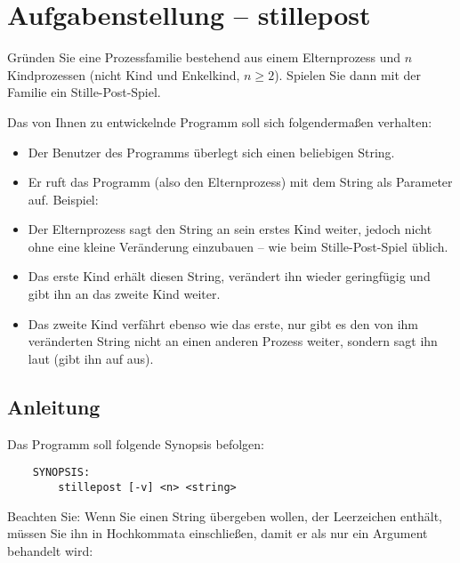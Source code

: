 




\section*{Aufgabenstellung -- stillepost}

Gründen Sie eine Prozessfamilie bestehend aus einem Elternprozess und
$n$ Kindprozessen (nicht Kind und Enkelkind, $n\ge2$). Spielen Sie dann mit
der Familie ein Stille-Post-Spiel.

Das von Ihnen zu entwickelnde Programm  soll sich
folgendermaßen verhalten:

\begin{itemize}
\item Der Benutzer des Programms überlegt sich einen beliebigen
String.
\item Er ruft das Programm (also den Elternprozess) mit dem String als
Parameter auf. Beispiel: 
\item Der Elternprozess sagt den String an sein erstes Kind weiter,
jedoch nicht ohne eine kleine Veränderung einzubauen -- wie beim
Stille-Post-Spiel üblich.
\item Das erste Kind erhält diesen String, verändert ihn wieder
geringfügig und gibt ihn an das zweite Kind weiter.
\item Das zweite Kind verfährt ebenso wie das erste, nur gibt es den
von ihm veränderten String nicht an einen anderen Prozess weiter,
sondern sagt ihn laut (gibt ihn auf  aus).
\end{itemize}

\subsection*{Anleitung}

Das Programm soll folgende Synopsis befolgen:
\begin{verbatim}
    SYNOPSIS:
        stillepost [-v] <n> <string>
\end{verbatim}

Beachten Sie: Wenn Sie einen String übergeben wollen, der Leerzeichen
enthält, müssen Sie ihn in Hochkommata einschließen, damit er als
nur ein Argument behandelt wird: 


